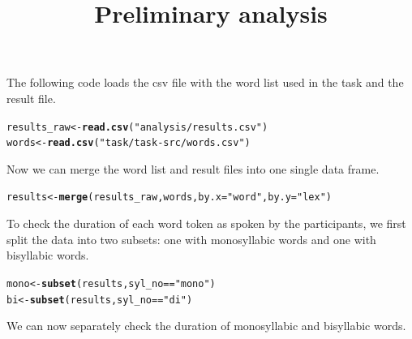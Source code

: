 \documentclass[a4paper,11pt]{article}\usepackage[]{graphicx}\usepackage[]{color}
\title{Preliminary analysis}
\makeatletter
\newcommand{\hlstr}[1]{\textcolor[rgb]{0.192,0.494,0.8}{#1}}%
\newcommand{\hlopt}[1]{\textcolor[rgb]{0,0,0}{#1}}%
\newcommand{\hlstd}[1]{\textcolor[rgb]{0.345,0.345,0.345}{#1}}%
\newcommand{\hlkwb}[1]{\textcolor[rgb]{0.69,0.353,0.396}{#1}}%
\newcommand{\hlkwc}[1]{\textcolor[rgb]{0.333,0.667,0.333}{#1}}%
\newcommand{\hlkwd}[1]{\textcolor[rgb]{0.737,0.353,0.396}{\textbf{#1}}}%
\newenvironment{kframe}{%
 \def\at@end@of@kframe{}%
 \ifinner\ifhmode%
  \def\at@end@of@kframe{\end{minipage}}%
  \begin{minipage}{\columnwidth}%
 \fi\fi%
 \def\FrameCommand##1{\hskip\@totalleftmargin \hskip-\fboxsep
 \colorbox{shadecolor}{##1}\hskip-\fboxsep
     \hskip-\linewidth \hskip-\@totalleftmargin \hskip\columnwidth}%
 \MakeFramed {\advance\hsize-\width
   \@totalleftmargin\z@ \linewidth\hsize
   \@setminipage}}%
 {\par\unskip\endMakeFramed%
 \at@end@of@kframe}
\newenvironment{knitrout}{}{} %
\makeatother
\begin{document}
\maketitle


The following code loads the csv file with the word list used in the task and the result file.

\begin{knitrout}
\color{fgcolor}\begin{kframe}
\begin{alltt}
\hlstd{results_raw} \hlkwb{<-} \hlkwd{read.csv}\hlstd{(}\hlstr{"analysis/results.csv"}\hlstd{)}
\hlstd{words} \hlkwb{<-} \hlkwd{read.csv}\hlstd{(}\hlstr{"task/task-src/words.csv"}\hlstd{)}
\end{alltt}
\end{kframe}
\end{knitrout}

Now we can merge the word list and result files into one single data frame.

\begin{knitrout}
\color{fgcolor}\begin{kframe}
\begin{alltt}
\hlstd{results} \hlkwb{<-} \hlkwd{merge}\hlstd{(results_raw, words,} \hlkwc{by.x} \hlstd{=} \hlstr{"word"}\hlstd{,} \hlkwc{by.y} \hlstd{=} \hlstr{"lex"}\hlstd{)}
\end{alltt}
\end{kframe}
\end{knitrout}

To check the duration of each word token as spoken by the participants, we first split the data into two subsets: one with monosyllabic words and one with bisyllabic words.

\begin{knitrout}
\color{fgcolor}\begin{kframe}
\begin{alltt}
\hlstd{mono} \hlkwb{<-} \hlkwd{subset}\hlstd{(results, syl_no} \hlopt{==} \hlstr{"mono"}\hlstd{)}
\hlstd{bi} \hlkwb{<-} \hlkwd{subset}\hlstd{(results, syl_no} \hlopt{==} \hlstr{"di"}\hlstd{)}
\end{alltt}
\end{kframe}
\end{knitrout}

We can now separately check the duration of monosyllabic and bisyllabic words.
\end{document}
